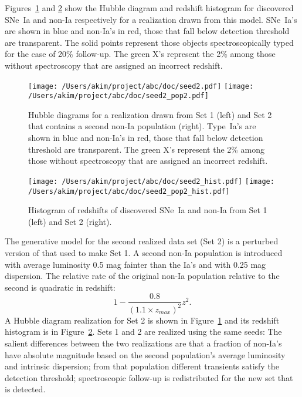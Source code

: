 \documentclass[preprint,3p]{elsarticle}
\begin{document}
Figures~\ref{hd:fig} and \ref{hist:fig} show
the Hubble diagram 
and redshift histogram for discovered SNe~Ia and non-Ia respectively
for a realization drawn from this model.
SNe~Ia's are shown in blue and non-Ia's in red, those that fall below detection threshold
are transparent.  The solid points
represent those objects spectroscopically typed for the case of 20\% follow-up.
The green X's represent the 2\% among those without spectroscopy that
are assigned an incorrect redshift.

\begin{figure}[htbp] %
   \centering
   \texttt{[image: /Users/akim/project/abc/doc/seed2.pdf]}
   \texttt{[image: /Users/akim/project/abc/doc/seed2\_pop2.pdf]}  
\caption{Hubble diagrams for a realization drawn from Set 1 (left)
and Set 2 that contains  a second non-Ia population (right).
Type~Ia's are shown in blue and non-Ia's in red, those that fall below detection threshold
are transparent.  The green X's represent the 2\% among those without spectroscopy that
are assigned an incorrect redshift.
   \label{hd:fig}}
\end{figure}

\begin{figure}[htbp] %
   \centering
   \texttt{[image: /Users/akim/project/abc/doc/seed2\_hist.pdf]}
   \texttt{[image: /Users/akim/project/abc/doc/seed2\_pop2\_hist.pdf]}  
\caption{Histogram of redshifts of discovered SNe~Ia and non-Ia from Set 1 (left)
and Set 2  (right).
   \label{hist:fig}}
\end{figure}

The generative model for the second realized data set (Set 2)
is a perturbed version of that used to make Set 1.
A second non-Ia population is introduced with average luminosity 0.5 mag fainter
than the Ia's and with 0.25 mag dispersion.
The relative rate of the original non-Ia population relative to the second is quadratic
in redshift:
\begin{equation}
1 -\frac{0.8}{\left(1.1\times z_{max}\right)^2}z^2.
\end{equation}
A Hubble diagram realization for Set 2 is shown in Figure~\ref{hd:fig} and its redshift histogram
is in Figure~\ref{hist:fig}.  Sets 1 and 2 are realized using the same seeds:
The salient differences
between the two realizations are that a fraction of non-Ia's have absolute magnitude
based on the second population's average luminosity and intrinsic dispersion; from
that population different transients satisfy the detection threshold; spectroscopic follow-up is redistributed
for the new set that is detected.
\end{document}
